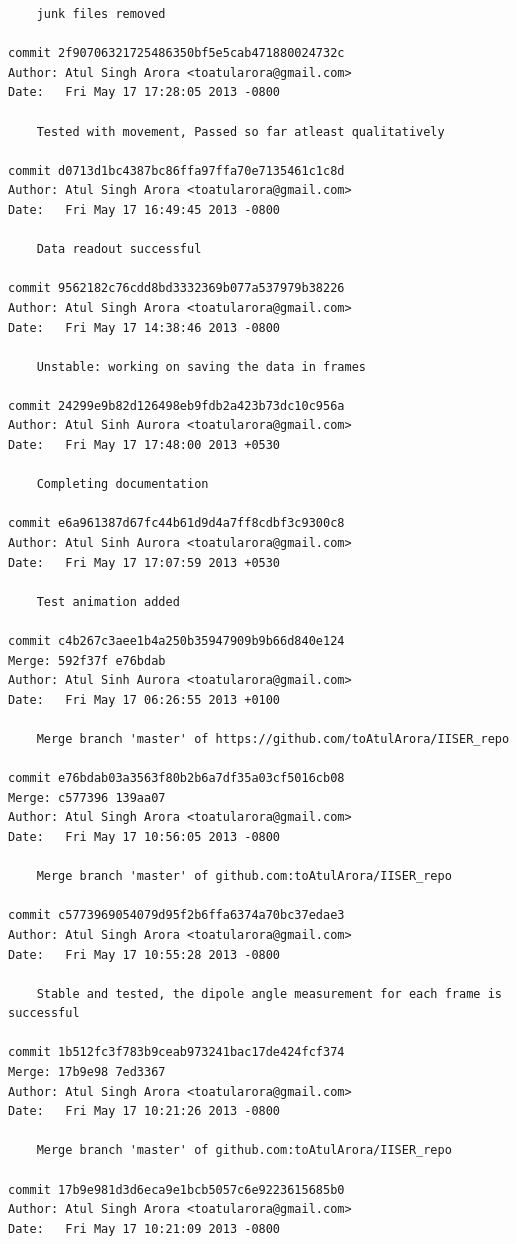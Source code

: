 \begin{lstlisting}
    junk files removed

commit 2f90706321725486350bf5e5cab471880024732c
Author: Atul Singh Arora <toatularora@gmail.com>
Date:   Fri May 17 17:28:05 2013 -0800

    Tested with movement, Passed so far atleast qualitatively

commit d0713d1bc4387bc86ffa97ffa70e7135461c1c8d
Author: Atul Singh Arora <toatularora@gmail.com>
Date:   Fri May 17 16:49:45 2013 -0800

    Data readout successful

commit 9562182c76cdd8bd3332369b077a537979b38226
Author: Atul Singh Arora <toatularora@gmail.com>
Date:   Fri May 17 14:38:46 2013 -0800

    Unstable: working on saving the data in frames

commit 24299e9b82d126498eb9fdb2a423b73dc10c956a
Author: Atul Sinh Aurora <toatularora@gmail.com>
Date:   Fri May 17 17:48:00 2013 +0530

    Completing documentation

commit e6a961387d67fc44b61d9d4a7ff8cdbf3c9300c8
Author: Atul Sinh Aurora <toatularora@gmail.com>
Date:   Fri May 17 17:07:59 2013 +0530

    Test animation added

commit c4b267c3aee1b4a250b35947909b9b66d840e124
Merge: 592f37f e76bdab
Author: Atul Sinh Aurora <toatularora@gmail.com>
Date:   Fri May 17 06:26:55 2013 +0100

    Merge branch 'master' of https://github.com/toAtulArora/IISER_repo

commit e76bdab03a3563f80b2b6a7df35a03cf5016cb08
Merge: c577396 139aa07
Author: Atul Singh Arora <toatularora@gmail.com>
Date:   Fri May 17 10:56:05 2013 -0800

    Merge branch 'master' of github.com:toAtulArora/IISER_repo

commit c5773969054079d95f2b6ffa6374a70bc37edae3
Author: Atul Singh Arora <toatularora@gmail.com>
Date:   Fri May 17 10:55:28 2013 -0800

    Stable and tested, the dipole angle measurement for each frame is successful

commit 1b512fc3f783b9ceab973241bac17de424fcf374
Merge: 17b9e98 7ed3367
Author: Atul Singh Arora <toatularora@gmail.com>
Date:   Fri May 17 10:21:26 2013 -0800

    Merge branch 'master' of github.com:toAtulArora/IISER_repo

commit 17b9e981d3d6eca9e1bcb5057c6e9223615685b0
Author: Atul Singh Arora <toatularora@gmail.com>
Date:   Fri May 17 10:21:09 2013 -0800


\end{lstlisting}
